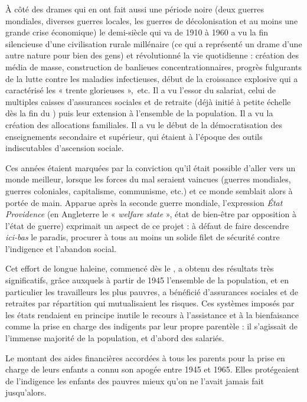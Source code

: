 

 À côté des drames qui en ont fait aussi une période noire (deux guerres mondiales, diverses guerres locales, les guerres de décolonisation et au moins une grande crise économique) le demi-siècle qui va de 1910 à 1960 a vu la fin silencieuse d'une civilisation rurale millénaire (ce qui a représenté un drame d'une autre nature pour bien des gens) et révolutionné la vie quotidienne : création des média de masse, construction de banlieues concentrationnaires, progrès fulgurants de la lutte contre les maladies infectieuses, début de la croissance explosive qui a caractérisé les « trente glorieuses »,~etc. Il a vu l'essor du salariat, celui de multiples caisses d'assurances sociales et de retraite (déjà initié à petite échelle dès la fin du ) puis leur extension à l'ensemble de la population. Il a vu la création des allocations familiales. Il a vu le début de la démocratisation des enseignements secondaire et supérieur, qui étaient à l'époque des outils indiscutables d'ascension sociale. 

 Ces années étaient marquées par la conviction qu'il était possible d'aller vers un monde meilleur, lorsque les forces du mal seraient vaincues (guerres mondiales, guerres coloniales, capitalisme, communisme, etc.) et ce monde semblait alors à portée de main. Apparue après la seconde guerre mondiale, l'expression \emph{État Providence} (en Angleterre le « \emph{welfare state} », état de bien-être par opposition à l'état de guerre) exprimait un aspect de ce projet : à défaut de faire descendre {\emph{ici-bas}} le paradis, procurer à tous au moins un solide filet de sécurité contre l'indigence et l'abandon social. 

 Cet effort de longue haleine, commencé dès le , a obtenu des résultats très significatifs, grâce auxquels à partir de 1945 l'ensemble de la population, et en particulier les travailleurs les plus pauvres, a bénéficié d'assurances sociales et de retraites par répartition qui mutualisaient les risques. Ces systèmes imposés par les états rendaient en principe inutile le recours à l'assistance et à la bienfaisance comme la prise en charge des indigents par leur propre parentèle : il s'agissait de l'immense majorité de la population, et d'abord des salariés. 

 Le montant des aides financières accordées à tous les parents pour la prise en charge de leurs enfants a connu son apogée entre 1945 et 1965. Elles protégeaient de l'indigence les enfants des pauvres mieux qu'on ne l'avait jamais fait jusqu'alors. 

